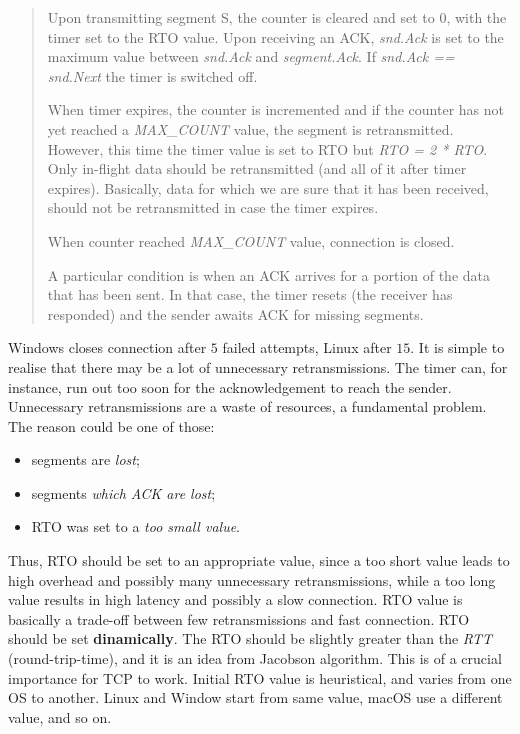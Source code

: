 \documentclass[a4paper, 11pt]{report}
\begin{document}
\begin{quote}
Upon transmitting segment S, the counter is cleared and set to $0$, with the
timer set to the RTO value. Upon receiving an ACK, \emph{snd.Ack} is set to
the maximum value between \emph{snd.Ack} and \emph{segment.Ack}. If
\emph{snd.Ack == snd.Next} the timer is switched off.

When timer expires, the counter is incremented and if the counter has not yet
reached a \emph{MAX\_COUNT} value, the segment is retransmitted. However, this
time the timer value is set to RTO but \emph{RTO = 2 * RTO}. Only in-flight data
should be retransmitted (and all of it after timer expires). Basically, data
for which we are sure that it has been received, should not be retransmitted in
case the timer expires.

When counter reached \emph{MAX\_COUNT} value, connection is closed.

A particular condition is when an ACK arrives for a portion of the data that
has been sent. In that case, the timer resets (the receiver has responded) and
the sender awaits ACK for missing segments.
\end{quote}

Windows closes connection after $5$ failed attempts, Linux after $15$. It is
simple to realise that there may be a lot of unnecessary retransmissions. The
timer can, for instance, run out too soon for the acknowledgement to reach the
sender. Unnecessary retransmissions are a waste of resources, a fundamental
problem. The reason could be one of those:

\begin{itemize}
    \item segments are \emph{lost};
    \item segments \emph{which ACK are lost};
    \item RTO was set to a \emph{too small value}.
\end{itemize}

Thus, RTO should be set to an appropriate value, since a too short value leads
to high overhead and possibly many unnecessary retransmissions, while a too
long value results in high latency and possibly a slow connection. RTO value is
basically a trade-off between few retransmissions and fast connection. RTO
should be set \textbf{dinamically}. The RTO should be slightly greater than the
\emph{RTT} (round-trip-time), and it is an idea from Jacobson algorithm. This
is of a crucial importance for TCP to work. Initial RTO value is heuristical,
and varies from one OS to another. Linux and Window start from same value,
macOS use a different value, and so on.
\end{document}
